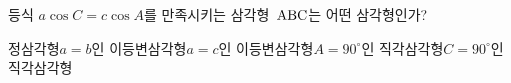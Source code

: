 등식 $a\cos C=c\cos A$를 만족시키는 삼각형~$\mathrm{ABC}$는 어떤 삼각형인가?
\begin{choicesii}{정삼각형}{$a=b$인 이등변삼각형}{$a=c$인 이등변삼각형}{$A=90^\circ$인 직각삼각형}{$C=90^\circ$인 직각삼각형}\end{choicesii}
